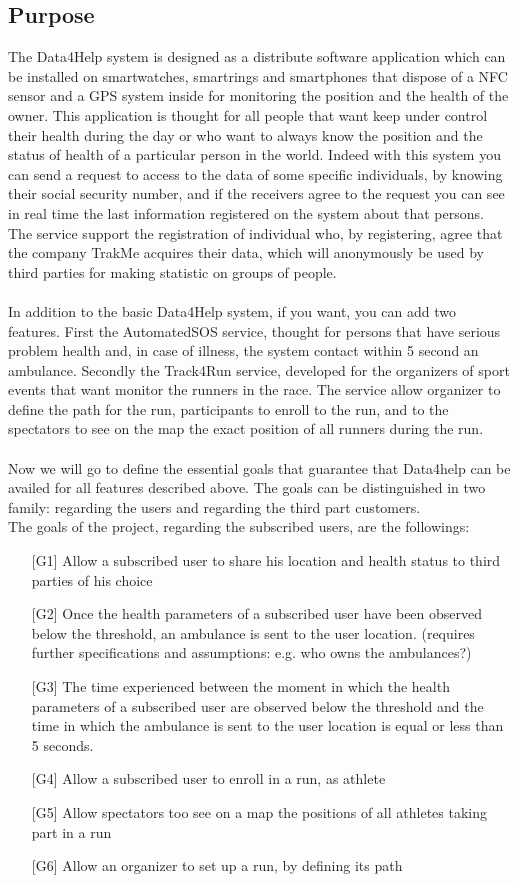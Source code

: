\subsection{Purpose}
The Data4Help system is designed as a distribute software application which can be installed on smartwatches, smartrings and smartphones that dispose of a NFC sensor and a GPS system inside for monitoring the position and the health of the owner. This application is thought for all people that want keep under control their health during the day or who want to always know the position and the status of health of a particular person in the world. Indeed with this system you can send a request to access to the data of some specific individuals, by knowing their social security number, and if the receivers agree to the request you can see in real time the last information registered on the system about that persons. The service support the registration of individual who, by registering, agree that the company TrakMe acquires their data, which will anonymously be used by third parties for making statistic on groups of people.\\\\
In addition to the basic Data4Help system, if you want, you can add two features. First the AutomatedSOS service, thought for persons that have serious problem health and, in case of illness, the system contact within 5 second an ambulance. Secondly the Track4Run service, developed for the organizers of sport events that want monitor the runners in the race. The service allow organizer to define the path for the run, participants to enroll to the run, and to the spectators to see on the map the exact position of all runners during the run. 
\\\\
Now we will go to define the essential goals that guarantee that Data4help can be availed for all features described above. The goals can be distinguished in two family: regarding the users and regarding the third part customers.\\
The goals of the project, regarding the subscribed users, are the followings:
\begin{enumerate}
\item[{[G1]}] Allow a subscribed user to share his location and health status to third parties of his choice
\item[{[G2]}]Once the health parameters of a subscribed user have been observed 
below the threshold, an ambulance is sent to the user location. (requires further specifications and assumptions: e.g. who owns the ambulances?)
\item[{[G3]}] The time experienced between the moment in which the health parameters of a subscribed user are observed below the threshold and the time in which the ambulance is sent to the user location is equal or less than 5 seconds. 
\item[{[G4]}] Allow a subscribed user to enroll in a run, as athlete
\item[{[G5]}] Allow spectators too see on a map the positions of all athletes taking part in a run
\item[{[G6]}] Allow an organizer to set up a run, by defining its path
\end{enumerate}
